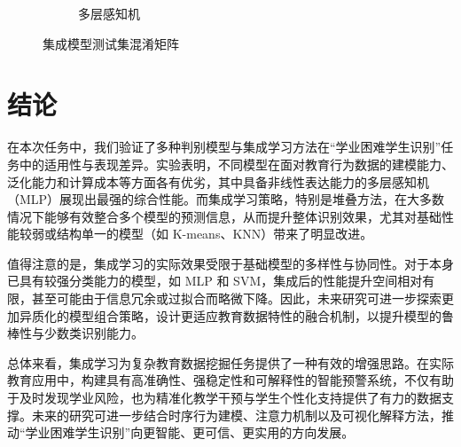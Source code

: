 \documentclass[a4paper, utf8]{ctexart}
\begin{document}
\begin{figure}
\begin{subfigure}{.32\textwidth}
			\caption{多层感知机}
		\end{subfigure}
		\caption{集成模型测试集混淆矩阵}
	\end{figure}
	
	\section{结论}
	
	在本次任务中，我们验证了多种判别模型与集成学习方法在“学业困难学生识别”任务中的适用性与表现差异。实验表明，不同模型在面对教育行为数据的建模能力、泛化能力和计算成本等方面各有优劣，其中具备非线性表达能力的多层感知机（MLP）展现出最强的综合性能。而集成学习策略，特别是堆叠方法，在大多数情况下能够有效整合多个模型的预测信息，从而提升整体识别效果，尤其对基础性能较弱或结构单一的模型（如 K-means、KNN）带来了明显改进。
	
	值得注意的是，集成学习的实际效果受限于基础模型的多样性与协同性。对于本身已具有较强分类能力的模型，如 MLP 和 SVM，集成后的性能提升空间相对有限，甚至可能由于信息冗余或过拟合而略微下降。因此，未来研究可进一步探索更加异质化的模型组合策略，设计更适应教育数据特性的融合机制，以提升模型的鲁棒性与少数类识别能力。
	
	总体来看，集成学习为复杂教育数据挖掘任务提供了一种有效的增强思路。在实际教育应用中，构建具有高准确性、强稳定性和可解释性的智能预警系统，不仅有助于及时发现学业风险，也为精准化教学干预与学生个性化支持提供了有力的数据支撑。未来的研究可进一步结合时序行为建模、注意力机制以及可视化解释方法，推动“学业困难学生识别”向更智能、更可信、更实用的方向发展。
	
	\let\cleardoublepage\clearpage
	
\end{document}
